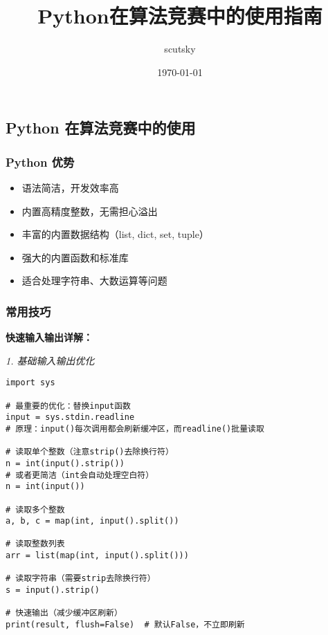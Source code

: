 \documentclass[a4paper,9pt,twocolumn]{ctexart}
\title{Python在算法竞赛中的使用指南}
\author{scutsky}
\date{\today}
\begin{document}
\maketitle

\subsection{Python 在算法竞赛中的使用}

\subsubsection{Python 优势}
\begin{itemize}
\item 语法简洁，开发效率高
\item 内置高精度整数，无需担心溢出
\item 丰富的内置数据结构（list, dict, set, tuple）
\item 强大的内置函数和标准库
\item 适合处理字符串、大数运算等问题
\end{itemize}

\subsubsection{常用技巧}

\textbf{快速输入输出详解：}

\textit{1. 基础输入输出优化}
\begin{verbatim}
import sys

# 最重要的优化：替换input函数
input = sys.stdin.readline
# 原理：input()每次调用都会刷新缓冲区，而readline()批量读取

# 读取单个整数（注意strip()去除换行符）
n = int(input().strip())
# 或者更简洁（int会自动处理空白符）
n = int(input())

# 读取多个整数
a, b, c = map(int, input().split())

# 读取整数列表
arr = list(map(int, input().split()))

# 读取字符串（需要strip去除换行符）
s = input().strip()

# 快速输出（减少缓冲区刷新）
print(result, flush=False)  # 默认False，不立即刷新
\end{verbatim}
\end{document}
